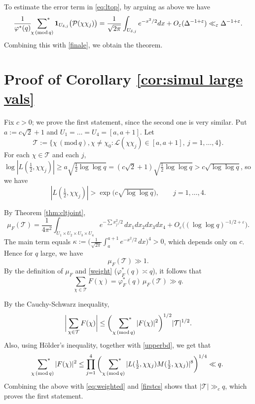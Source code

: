 \documentclass[12pt, reqno]{amsart}
\renewcommand{\pmod}[1]{\,(\mathrm{mod}\,#1)}
\numberwithin{equation}{section}
\numberwithin{theorem}{section}
\numberwithin{equation}{section}
\def\half{\tfrac{1}{2}}
\def\sumstar{\sideset{}{^*}\sum}
\begin{document}
To estimate the error term in \eqref{eq:ltop}, by arguing as above we have
\[
\frac{1}{\varphi^*(q)}\,\sumstar_{\chi \pmod q} \mathbf{1}_{U_{\delta,j}}\big(\mathcal P(\chi\chi_j)\big)=\frac{1}{\sqrt{2\pi}}\int_{U_{\delta,j}}e^{-x^2/2}dx+O_\varepsilon(\Delta^{-1+\varepsilon})\ll_\varepsilon \Delta^{-1+\varepsilon}. 
\]
Combining this with \eqref{finale}, we obtain the theorem.


\section{Proof of Corollary \ref{cor:simul large vals}}
  \label{cor_proof}
Fix $c>0$; we prove the first statement, since the second one is very similar. Put $a:=c\sqrt2+1$ and
$U_1=\dots=U_4=[a,a+1]$. 
Let
$$\mathcal T:=\Big\{\chi\pmod q, \chi \neq \chi_0:\mathcal L(\chi\chi_j)\in[a,a+1],\ j=1,\dots,4\Big\}.$$
For each $\chi\in\mathcal T$ and each $j$,
$\log|L(\half,\chi\chi_j)|\ge a\sqrt{\half\log\log q}=(c\sqrt2+1)\sqrt{\half\log\log q}
>c\sqrt{\log\log q}$, so we have
\begin{equation*}
|L(\half,\chi\chi_j)|>\exp\Big(c\sqrt{\log\log q}\Big),\qquad j=1,\dots,4.
\end{equation*}

By Theorem \ref{thm:cltjoint},
\begin{equation*}
\mu_F(\mathcal{T})
=\frac{1}{4\pi^2}\int_{U_1\times U_2\times U_3\times U_4}e^{-\sum x_j^2/2}\,dx_1dx_2dx_3dx_4
+O_\varepsilon\big((\log\log q)^{-1/2+\varepsilon}\big).
\end{equation*}
The main term equals
$\kappa:=\big(\tfrac{1}{\sqrt{2\pi}}\int_a^{a+1}e^{-x^2/2}\,dx\big)^4>0$, which depends
only on $c$. Hence for $q$ large, we have 
\begin{equation*}
\mu_F(\mathcal T) \gg 1.
\end{equation*}
By the definition of $\mu_F$ and \eqref{weight} ($\varphi_F^*(q)\asymp q$), it follows that
\begin{equation}\label{eq:weighted}
\sum_{\chi\in\mathcal T}  F(\chi)=\varphi_F^*(q)\,\mu_F(\mathcal T)\gg q.
\end{equation}

By the Cauchy-Schwarz inequality,
\begin{equation}
\label{firstcs}
\bigg| \sum_{\chi\in\mathcal T} F(\chi)\bigg|
\le\bigg(\ \sumstar_{\chi \pmod q}|F(\chi)|^2\bigg)^{1/2}|\mathcal T|^{1/2}.
\end{equation}
Also, using 
 H\"older's inequality, together with \eqref{upperbd}, we get that
$$
\sumstar_{\chi \pmod q}|F(\chi)|^2
\le\prod_{j=1}^4\bigg(\ \sumstar_{\chi \pmod q}|L(\half,\chi\chi_j)M(\half,\chi\chi_j)|^{8}\bigg)^{1/4}
\ll q.
$$
Combining the above with \eqref{eq:weighted} and \eqref{firstcs}
shows that
$|\mathcal{T} |\gg_c q$, which proves the first statement.
 
\end{document}
